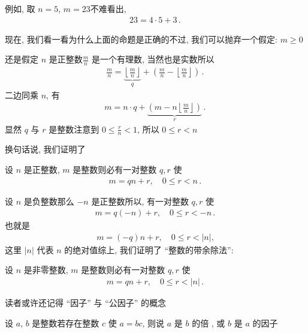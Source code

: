 例如, 取 $n=5$, $m=23$\period 不难看出,
\begin{align*}
    23 = 4 \cdot 5 + 3 \period
\end{align*}

现在, 我们看一看为什么上面的命题是正确的\period 不过, 我们可以抛弃一个假定: $m \geq 0$\period

还是假定 $n$ 是正整数\period $\frac{m}{n}$ 是一个有理数, 当然也是实数\period 所以
\begin{align*}
    \frac{m}{n} = \underbrace{\left\lfloor \frac{m}{n} \right\rfloor}_{q} + \left( \frac{m}{n} - \left\lfloor \frac{m}{n} \right\rfloor \right) \period
\end{align*}
二边同乘 $n$, 有
\begin{align*}
    m = n \cdot q + \underbrace{\left( m - n\left\lfloor \frac{m}{n} \right\rfloor \right)}_{r} \period
\end{align*}
显然 $q$ 与 $r$ 是整数\period 注意到 $0 \leq \frac{r}{n} < 1$, 所以 $0 \leq r < n$\period

换句话说, 我们证明了
\begin{proposition}
    设 $n$ 是正整数, $m$ 是整数\period 则必有一对整数 $q,r$ 使
    \begin{align*}
        m = qn + r, \quad 0 \leq r < n \period
    \end{align*}
\end{proposition}

设 $n$ 是负整数\period 那么 $-n$ 是正整数\period 所以, 有一对整数 $q,r$ 使
\begin{align*}
    m = q(-n) + r, \quad 0 \leq r < -n \period
\end{align*}
也就是
\begin{align*}
    m = (-q)n + r, \quad 0 \leq r < |n|,
\end{align*}
这里 $|n|$ 代表 $n$ 的绝对值\period 综上, 我们证明了 ``整数的带余除法'':
\begin{proposition}
    设 $n$ 是非零整数, $m$ 是整数\period 则必有一对整数 $q,r$ 使
    \begin{align*}
        m = qn + r, \quad 0 \leq r < |n| \period
    \end{align*}
\end{proposition}

读者或许还记得 ``因子'' 与 ``公因子'' 的概念\period
\begin{definition}
    设 $a$, $b$ 是整数\period 若存在整数 $c$ 使 $a=bc$, 则说 $a$ 是 $b$ 的倍 , 或 $b$ 是 $a$ 的因子 \period
\end{definition}

